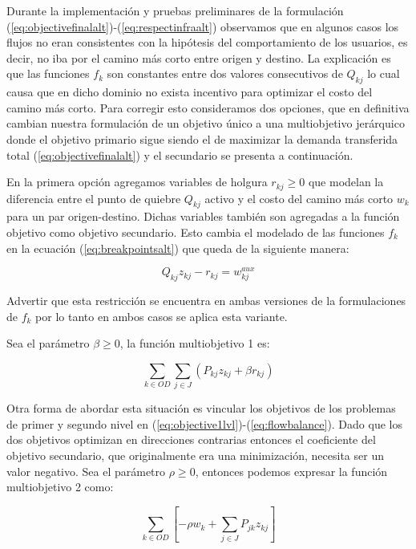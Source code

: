 \documentclass{article}
\begin{document}
  Durante la implementación y pruebas preliminares de la formulación (\ref{eq:objectivefinalalt})-(\ref{eq:respectinfraalt}) observamos que en algunos casos los flujos no eran consistentes con la hipótesis del comportamiento de los usuarios, es decir, no iba por el camino más corto entre origen y destino. La explicación es que las funciones $f_k$ son constantes entre dos valores consecutivos de $Q_{kj}$ lo cual causa que en dicho dominio no exista incentivo para optimizar el costo del camino más corto. Para corregir esto consideramos dos opciones, que en definitiva cambian nuestra formulación de un objetivo único a una multiobjetivo jerárquico donde el objetivo primario sigue siendo el de maximizar la demanda transferida total (\ref{eq:objectivefinalalt}) y el secundario se presenta a continuación.

  En la primera opción agregamos variables de holgura $r_{kj} \geq 0$ que modelan la diferencia entre el punto de quiebre $Q_{kj}$ activo y el costo del camino más corto $w_k$ para un par origen-destino. Dichas variables también son agregadas a la función objetivo como objetivo secundario. Esto cambia el modelado de las funciones $f_k$ en la ecuación (\ref{eq:breakpointsalt}) que queda de la siguiente manera:

  \begin{equation}
    \label{eq:multipleobj1breakpoint}
    Q_{kj} z_{kj} - r_{kj} = w^{aux}_{kj}
  \end{equation}

  Advertir que esta restricción se encuentra en ambas versiones de la formulaciones de $f_k$ por lo tanto en ambos casos se aplica esta variante.

  Sea el parámetro $\beta \geq 0$, la función multiobjetivo 1 es:

  \begin{equation}
    \label{eq:multipleobj1}
    \sum_{k \in OD} \sum_{j \in J} \left( P_{kj}z_{kj} + \beta r_{kj} \right)
  \end{equation}

  Otra forma de abordar esta situación es vincular los objetivos de los problemas de primer y segundo nivel en (\ref{eq:objective1lvl})-(\ref{eq:flowbalance}). Dado que los dos objetivos optimizan en direcciones contrarias entonces el coeficiente del objetivo secundario, que originalmente era una minimización, necesita ser un valor negativo. Sea el parámetro $\rho \geq 0$, entonces podemos expresar la función multiobjetivo 2 como:

  \begin{equation}
    \label{eq:multipleobj2}
    \sum_{k \in OD} \left[ -\rho w_k + \sum_{j \in J} P_{jk}z_{kj} \right]
  \end{equation}
\end{document}
